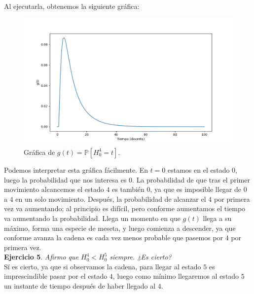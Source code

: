 \documentclass[11pt,a4paper]{article}
\begin{document}
Al ejecutarla, obtenemos la siguiente gráfica:
\begin{figure}[h!]
  \centering
  \includegraphics[width=.9\textwidth]{ej4.png}
  \caption{Gráfica de $g(t)=\mathbb P[H_0^4=t].$}
\end{figure}

Podemos interpretar esta gráfica fácilmente. En $t=0$ estamos en el estado $0$, luego la probabilidad que nos interesa es $0$. La probabilidad de que tras el primer movimiento alcancemos el estado $4$ es también 0, ya que es imposible llegar de $0$ a $4$ en un solo movimiento. Después, la probabilidad de alcanzar el $4$ por primera vez va aumentando; al principio es difícil, pero conforme aumentamos el tiempo va aumentando la probabilidad. Llega un momento en que $g(t)$ llega a su máximo, forma una especie de meseta, y luego comienza a descender, ya que conforme avanza la cadena es cada vez menos probable que pasemos por $4$ por primera vez.\\

\textbf{Ejercicio 5}. \textit{Afirmo que $H_0^4 < H_0^5$ siempre. ¿Es cierto?}\\

Sí es cierto, ya que si observamos la cadena, para llegar al estado $5$ es imprescindible pasar por el estado $4$, luego como mínimo llegaremos al estado $5$ un instante de tiempo después de haber llegado al $4$.
\end{document}
